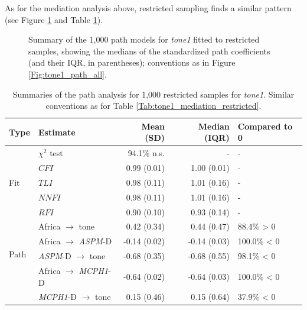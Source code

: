 \documentclass[twoside,twocolumn]{article}
\begin{document}
As for the mediation analysis above, restricted sampling finds a similar pattern (see Figure \ref{Fig:tone1_path_restricted} and Table \ref{Tab:tone1_path_restricted}).

\begin{figure}[h]
  \centering


  \caption{Summary of the 1,000 path models for \textit{tone1} fitted to restricted samples, showing the medians of the standardized path coefficients (and their IQR, in parentheses); conventions as in Figure \ref{Fig:tone1_path_all}. }
  \label{Fig:tone1_path_restricted}
\end{figure}

\begin{table}[h]
  \caption{Summaries of the path analysis for 1,000 restricted samples for \textit{tone1}. Similar conventions as for Table \ref{Tab:tone1_mediation_restricted}.}
  \label{Tab:tone1_path_restricted}
  \centering
  \begin{tabular}{|l|l|r|r|l|}
    \toprule
    \textbf{Type} & \textbf{Estimate} & \textbf{Mean (SD)} & \textbf{Median (IQR)} & \textbf{Compared to 0} \\
    \midrule
    \multirow{5}{*}{Fit} & $\chi^2$ test & 94.1\% n.s. & - & - \\
    & $CFI$  & 0.99 (0.01) & 1.00 (0.01) & - \\
    & $TLI$  & 0.98 (0.11) & 1.01 (0.16) & - \\
    & $NNFI$ & 0.98 (0.11) & 1.01 (0.16) & - \\
    & $RFI$  & 0.90 (0.10) & 0.93 (0.14) & - \\
    \midrule
    \multirow{4}{*}{Path} & Africa $\rightarrow$ tone & 0.42 (0.34) & 0.44 (0.47) & 88.4\% > 0 \\
    & Africa $\rightarrow$ \textit{ASPM}-D  & -0.14 (0.02) & -0.14 (0.03) & 100.0\% < 0 \\
    & \textit{ASPM}-D  $\rightarrow$ tone & -0.68 (0.35) & -0.68 (0.55) & 98.1\% < 0 \\
    & Africa $\rightarrow$ \textit{MCPH1}-D & -0.64 (0.02) & -0.64 (0.03) & 100.0\% < 0 \\
    & \textit{MCPH1}-D $\rightarrow$ tone &  0.15 (0.46) &  0.15 (0.64) & 37.9\% < 0 \\
    \bottomrule
  \end{tabular}
\end{table}
\end{document}
